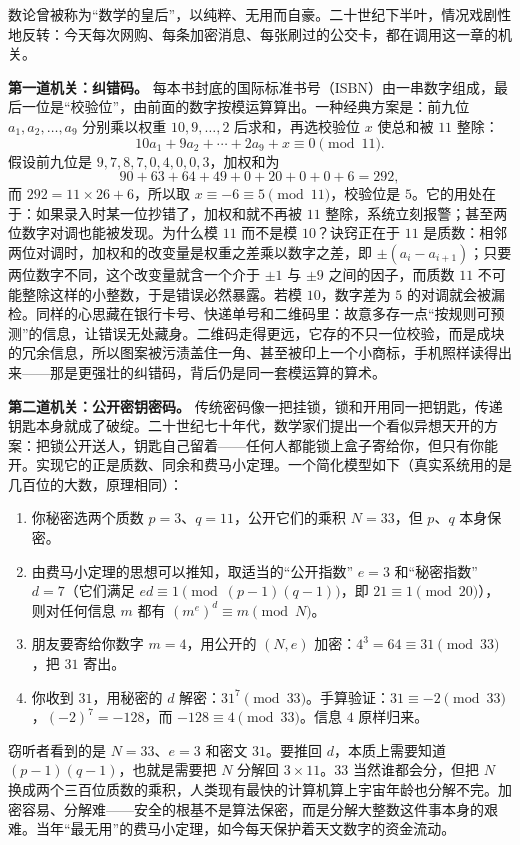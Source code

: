 数论曾被称为“数学的皇后”，以纯粹、无用而自豪。二十世纪下半叶，情况戏剧性地反转：今天每次网购、每条加密消息、每张刷过的公交卡，都在调用这一章的机关。

\textbf{第一道机关：纠错码。} 每本书封底的国际标准书号（ISBN）由一串数字组成，最后一位是“校验位”，由前面的数字按模运算算出。一种经典方案是：前九位 $a_1,a_2,\dots,a_9$ 分别乘以权重 $10,9,\dots,2$ 后求和，再选校验位 $x$ 使总和被 $11$ 整除：
\[
10a_1+9a_2+\cdots+2a_9+x\equiv0\pmod{11}.
\]
假设前九位是 $9,7,8,7,0,4,0,0,3$，加权和为
\[
90+63+64+49+0+20+0+0+6=292,
\]
而 $292=11\times26+6$，所以取 $x\equiv-6\equiv5\pmod{11}$，校验位是 $5$。它的用处在于：如果录入时某一位抄错了，加权和就不再被 $11$ 整除，系统立刻报警；甚至两位数字对调也能被发现。为什么模 $11$ 而不是模 $10$？诀窍正在于 $11$ 是质数：相邻两位对调时，加权和的改变量是权重之差乘以数字之差，即 $\pm(a_i-a_{i+1})$；只要两位数字不同，这个改变量就含一个介于 $\pm1$ 与 $\pm9$ 之间的因子，而质数 $11$ 不可能整除这样的小整数，于是错误必然暴露。若模 $10$，数字差为 $5$ 的对调就会被漏检。同样的心思藏在银行卡号、快递单号和二维码里：故意多存一点“按规则可预测”的信息，让错误无处藏身。二维码走得更远，它存的不只一位校验，而是成块的冗余信息，所以图案被污渍盖住一角、甚至被印上一个小商标，手机照样读得出来——那是更强壮的纠错码，背后仍是同一套模运算的算术。

\textbf{第二道机关：公开密钥密码。} 传统密码像一把挂锁，锁和开用同一把钥匙，传递钥匙本身就成了破绽。二十世纪七十年代，数学家们提出一个看似异想天开的方案：把锁公开送人，钥匙自己留着——任何人都能锁上盒子寄给你，但只有你能开。实现它的正是质数、同余和费马小定理。一个简化模型如下（真实系统用的是几百位的大数，原理相同）：

\begin{enumerate}
  \item 你秘密选两个质数 $p=3$、$q=11$，公开它们的乘积 $N=33$，但 $p$、$q$ 本身保密。
  \item 由费马小定理的思想可以推知，取适当的“公开指数” $e=3$ 和“秘密指数” $d=7$（它们满足 $ed\equiv1\pmod{(p-1)(q-1)}$，即 $21\equiv1\pmod{20}$），则对任何信息 $m$ 都有 $(m^e)^d\equiv m\pmod N$。
  \item 朋友要寄给你数字 $m=4$，用公开的 $(N,e)$ 加密：$4^3=64\equiv31\pmod{33}$，把 $31$ 寄出。
  \item 你收到 $31$，用秘密的 $d$ 解密：$31^7\pmod{33}$。手算验证：$31\equiv-2\pmod{33}$，$(-2)^7=-128$，而 $-128\equiv4\pmod{33}$。信息 $4$ 原样归来。
\end{enumerate}

窃听者看到的是 $N=33$、$e=3$ 和密文 $31$。要推回 $d$，本质上需要知道 $(p-1)(q-1)$，也就是需要把 $N$ 分解回 $3\times11$。$33$ 当然谁都会分，但把 $N$ 换成两个三百位质数的乘积，人类现有最快的计算机算上宇宙年龄也分解不完。加密容易、分解难——安全的根基不是算法保密，而是分解大整数这件事本身的艰难。当年“最无用”的费马小定理，如今每天保护着天文数字的资金流动。

